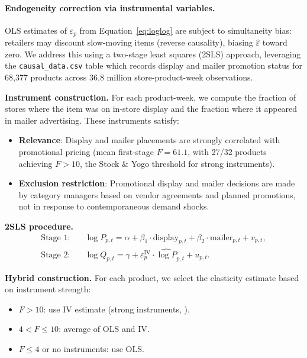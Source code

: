 \documentclass[11pt,a4paper]{article}
\begin{document}
\paragraph{Endogeneity correction via instrumental variables.}
OLS estimates of $\varepsilon_p$ from Equation~\eqref{eq:loglog} are subject to simultaneity bias: retailers may discount slow-moving items (reverse causality), biasing $\hat{\varepsilon}$ toward zero.
We address this using a two-stage least squares (2SLS) approach, leveraging the \texttt{causal\_data.csv} table which records display and mailer promotion status for 68,377 products across 36.8 million store-product-week observations.

\textbf{Instrument construction.}
For each product-week, we compute the fraction of stores where the item was on in-store display and the fraction where it appeared in mailer advertising.
These instruments satisfy:
\begin{itemize}
    \item \textbf{Relevance}: Display and mailer placements are strongly correlated with promotional pricing (mean first-stage $F = 61.1$, with 27/32 products achieving $F > 10$, the Stock \& Yogo threshold for strong instruments).
    \item \textbf{Exclusion restriction}: Promotional display and mailer decisions are made by category managers based on vendor agreements and planned promotions, not in response to contemporaneous demand shocks.
\end{itemize}

\textbf{2SLS procedure.}
\begin{align}
    \text{Stage 1:}\quad & \log P_{p,t} = \alpha + \beta_1 \cdot \text{display}_{p,t} + \beta_2 \cdot \text{mailer}_{p,t} + v_{p,t}, \\
    \text{Stage 2:}\quad & \log Q_{p,t} = \gamma + \varepsilon_p^{\text{IV}} \cdot \widehat{\log P}_{p,t} + u_{p,t}.
\end{align}

\textbf{Hybrid construction.}
For each product, we select the elasticity estimate based on instrument strength:
\begin{itemize}
    \item $F > 10$: use IV estimate (strong instruments, \citealt{blp1995}).
    \item $4 < F \leq 10$: average of OLS and IV.
    \item $F \leq 4$ or no instruments: use OLS.
\end{itemize}
\end{document}
